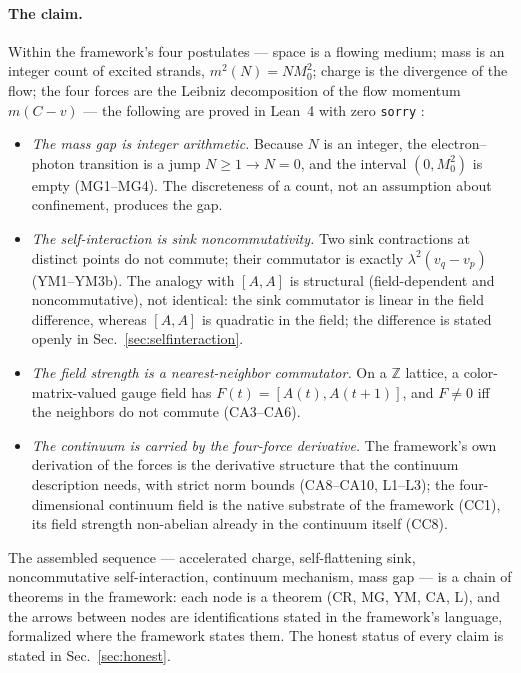 \documentclass[aps,prd,preprint,superscriptaddress,amsmath,amssymb]{revtex4-2}
\begin{document}
\paragraph{The claim.}
Within the framework's four postulates --- space is a flowing medium;
mass is an integer count of excited strands, $m^2(N)=N M_0^2$; charge
is the divergence of the flow; the four forces are the Leibniz
decomposition of the flow momentum $m(C-v)$ --- the following are
proved in Lean~4 with zero \texttt{sorry}
\cite{de2015lean,ProjectionPhysics}:
\begin{itemize}
\item \emph{The mass gap is integer arithmetic.}  Because $N$ is an
integer, the electron--photon transition is a jump
$N\ge1\to N=0$, and the interval $(0,M_0^2)$ is empty (MG1--MG4).
The discreteness of a count, not an assumption about confinement,
produces the gap.
\item \emph{The self-interaction is sink noncommutativity.}  Two sink
contractions at distinct points do not commute; their commutator is
exactly $\lambda^2(v_q-v_p)$ (YM1--YM3b).  The analogy with
$[A,A]$ is structural (field-dependent and noncommutative), not
identical: the sink commutator is linear in the field difference,
whereas $[A,A]$ is quadratic in the field; the difference is stated
openly in Sec.~\ref{sec:selfinteraction}.
\item \emph{The field strength is a nearest-neighbor commutator.}  On a
$\mathbb{Z}$ lattice, a color-matrix-valued gauge field has
$F(t)=[A(t),A(t{+}1)]$, and $F\neq0$ iff the neighbors do not commute
(CA3--CA6).
\item \emph{The continuum is carried by the four-force derivative.}  The
framework's own derivation of the forces is the derivative
structure that the continuum description needs, with strict norm
bounds (CA8--CA10, L1--L3); the four-dimensional continuum field is
the native substrate of the framework (CC1), its field strength
non-abelian already in the continuum itself (CC8).
\end{itemize}
The assembled sequence --- accelerated charge, self-flattening sink,
noncommutative self-interaction, continuum mechanism, mass gap --- is
a chain of theorems in the framework: each node is a theorem (CR, MG,
YM, CA, L), and the arrows between nodes are identifications stated
in the framework's language, formalized where the framework states
them.  The honest status of every claim is stated in Sec.~\ref{sec:honest}.
\end{document}
